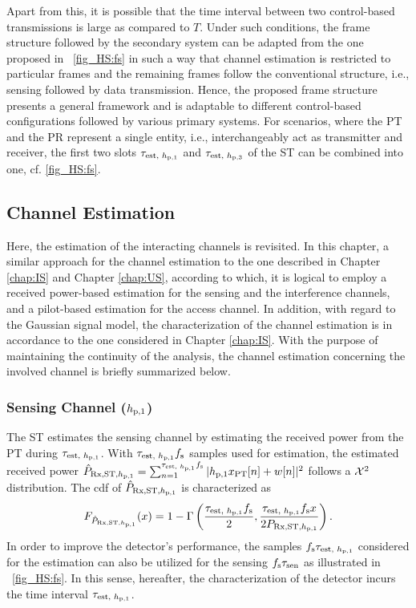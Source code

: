 Apart from this, it is possible that the time interval between two control-based transmissions is large as compared to $T$. Under such conditions, the frame structure followed by the secondary system can be adapted from the one proposed in \figurename~\ref{fig_HS:fs} in such a way that channel estimation is restricted to particular frames and the remaining frames follow the conventional structure, i.e., sensing followed by data transmission. Hence, the proposed frame structure presents a general framework and is adaptable to different control-based configurations followed by various primary systems. For scenarios, where the PT and the PR represent a single entity, i.e., interchangeably act as transmitter and receiver, the first two slots $\tau_{\text{est, $h_{\text{p,1}}$}}$ and $\tau_{\text{est, $h_{\text{p,3}}$}}$ of the ST can be combined into one, cf. \figurename\ref{fig_HS:fs}. 


\subsection{Channel Estimation}
Here, the estimation of the interacting channels is revisited. In this chapter, a similar approach for the channel estimation to the one described in Chapter \ref{chap:IS} and Chapter \ref{chap:US}, according to which, it is logical to employ a received power-based estimation for the sensing and the interference channels, and a pilot-based estimation for the access channel. In addition, with regard to the Gaussian signal model, the characterization of the channel estimation is in accordance to the one considered in Chapter \ref{chap:IS}. With the purpose of maintaining the continuity of the analysis, the channel estimation concerning the involved channel is briefly summarized below. 
\subsubsection*{Sensing Channel ($h_{\text{p,1}}$)}
The ST estimates the sensing channel by estimating the received power from the PT during $\tau_{\text{est, $h_{\text{p,1}}$}}$. With $\tau_{\text{est, $h_{\text{p,1}}$}} f_{\text{s}}$ samples used for estimation, the estimated received power $\hat{P}_{\text{Rx,ST,$h_{\text{p,1}}$}} = \sum_{n = 1}^{\tau_{\text{est, $h_{\text{p,1}}$}} f_{\text{s}}} |h_{\text{p,1}} x_{\text{PT}}[n] + w[n]|^2$ follows a $\cchi2$ distribution.
The cdf of $\hat{P}_{\text{Rx,ST,$h_{\text{p,1}}$}}$ is characterized as
\begin{align}
F_{\hat{P}_{\text{Rx,ST,$h_{\text{p,1}}$}}}(x) = 1 - \Gamma \left( \frac{\tau_{\text{est, $h_{\text{p,1}}$}} f_{\text{s}}}{2}, \frac{\tau_{\text{est, $h_{\text{p,1}}$}} f_{\text{s}} x}{2 P_{\text{Rx,ST,$h_{\text{p,1}}$}}} \right) \label{eq_HS:fprcvdstpt}.
\end{align}
In order to improve the detector's performance, the samples $f_{\text{s}} \tau_{\text{est, $h_{\text{p,1}}$}}$ considered for the estimation can also be utilized for the sensing $f_{\text{s}} \tau_{\text{sen}}$ as illustrated in \figurename~\ref{fig_HS:fs}. In this sense, hereafter, the characterization of the detector incurs the time interval $\tau_{\text{est, $h_{\text{p,1}}$}}$. 
  
